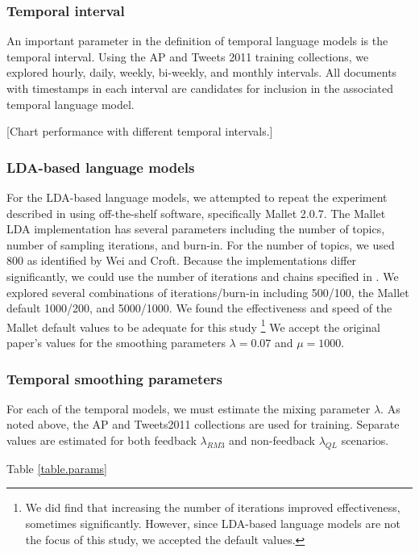\documentclass{sig-alternate}
\begin{document}
\subsubsection{Temporal interval}

An important parameter in the definition of temporal language models is the temporal interval.  Using the AP and Tweets 2011 training collections, we explored hourly, daily, weekly, bi-weekly, and monthly intervals.
All documents with timestamps in each interval are candidates for inclusion in the associated temporal language model.

[Chart performance with different temporal intervals.]

\subsubsection{LDA-based language models}

For the LDA-based language models, we attempted to repeat the experiment described in \cite{Wei2006} using off-the-shelf software, specifically Mallet 2.0.7. The Mallet LDA implementation
has several parameters including the number of topics, number of sampling iterations, and burn-in. For the number of topics, we used 800 as identified by Wei and Croft. Because the implementations
differ significantly, we could use the number of iterations and chains specified in \cite{Wei2006}. We explored several combinations of iterations/burn-in including 500/100, the Mallet default 1000/200, and 5000/1000. 
We found the effectiveness and speed of the Mallet default values to be adequate for this study \footnote{We did find that increasing the number of iterations improved effectiveness, sometimes significantly. However, since 
LDA-based language models are not the focus of this study, we accepted the default values.}  We accept the original paper's values for the smoothing parameters $\lambda=0.07$ and $\mu=1000$.

\subsubsection{Temporal smoothing parameters}

For each of the temporal models, we must estimate the mixing parameter $\lambda$.  As noted above, the AP and Tweets2011 collections are used for training. Separate values are estimated for 
both feedback $\lambda_{RM3}$ and non-feedback $\lambda_{QL}$ scenarios.

Table \ref{table.params}
\end{document}
